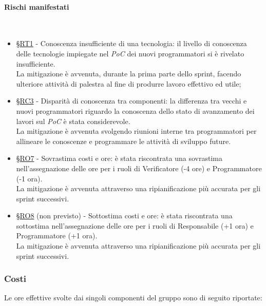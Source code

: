 \documentclass[10pt, letterpaper]{article}
\newcommand{\trisubsection}[1]{\paragraph{#1}\mbox{}\\}
\newcommand{\rif}[1]{\hyperref[#1]{§#1}}
\begin{document}
\trisubsection{Rischi manifestati}
\begin{itemize}
    \item \rif{RT1} - Conoscenza insufficiente di una tecnologia: il livello di conoscenza delle tecnologie impiegate nel \textit{PoC} dei nuovi programmatori si è rivelato insufficiente.
          \\La mitigazione è avvenuta, durante la prima parte dello sprint, facendo ulteriore attività di palestra al fine di produrre lavoro effettivo ed utile;
    \item \rif{RC3} - Disparità di conoscenza tra componenti: la differenza tra vecchi e nuovi programmatori riguardo la conoscenza dello stato di avanzamento dei lavori sul \textit{PoC} è stata considerevole.
          \\La mitigazione è avvenuta svolgendo riunioni interne tra programmatori per allineare le conoscenze e programmare le attività di sviluppo future.
    \item \rif{RO7} - Sovrastima costi e ore: è stata riscontrata una sovrastima nell'assegnazione delle ore per i ruoli di Verificatore (-4 ore) e Programmatore (-1 ora).
          \\La mitigazione è avvenuta attraverso una ripianificazione più accurata per gli sprint successivi.
    \item \rif{RO8} (non previsto) - Sottostima costi e ore: è stata riscontrata una sottostima nell'assegnazione delle ore per i ruoli di Responsabile (+1 ora) e Programmatore (+1 ora).
          \\La mitigazione è avvenuta attraverso una ripianificazione più accurata per gli sprint successivi.
\end{itemize}

\subsubsection{Costi}
Le ore effettive svolte dai singoli componenti del gruppo sono di seguito riportate:

\setRuoloFilippo{\Verif}
\setRuoloChristian{\Progr}
\setRuoloValeria{\Amm}
\setRuoloGiuseppe{\Verif}
\setRuoloFrancesco{\Progr}
\setRuoloLuca{\Resp}
\setRuoloLeonardo{\Progr}


\end{document}
